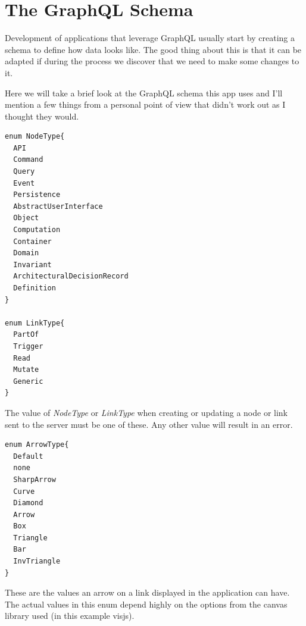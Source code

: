 \section{The GraphQL Schema}
Development of applications that leverage GraphQL usually start by creating a schema to define how data looks like. The good thing about this is that it can be adapted if during the process we discover that we need to make some changes to it.

Here we will take a brief look at the GraphQL schema this app uses and I'll mention a few things from a personal point of view that didn't work out as I thought they would.
\begin{lstlisting}[caption={GraphQL Enums},label={enums}]
enum NodeType{
  API
  Command
  Query
  Event
  Persistence
  AbstractUserInterface
  Object
  Computation
  Container
  Domain
  Invariant
  ArchitecturalDecisionRecord
  Definition
}

enum LinkType{
  PartOf
  Trigger
  Read
  Mutate
  Generic
}
\end{lstlisting}
The value of \emph{NodeType} or \emph{LinkType} when creating or updating a node or link sent to the server must be one of these. Any other value will result in an error.

\begin{lstlisting}
enum ArrowType{
  Default
  none
  SharpArrow
  Curve
  Diamond
  Arrow
  Box
  Triangle
  Bar
  InvTriangle
}
\end{lstlisting}
These are the values an arrow on a link displayed in the application can have. The actual values in this enum depend highly on the options from the canvas library used (in this example visjs).

